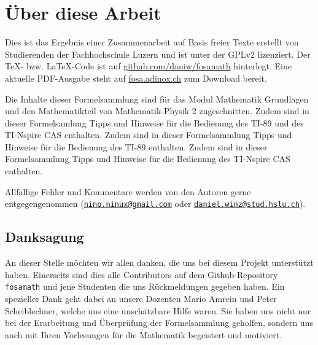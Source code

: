 



\chapter*{Über diese Arbeit}
Dies ist das Ergebnis einer Zusammenarbeit auf Basis freier Texte erstellt von 
Studierenden der Fachhochschule Luzern und ist unter der GPLv2 lizenziert. 
Der \TeX - bzw. \LaTeX -Code ist auf \url{github.com/daniw/fosamath} 
hinterlegt. Eine aktuelle PDF-Ausgabe steht auf \url{fosa.adinox.ch} zum 
Download bereit.

Die Inhalte dieser Formelsammlung sind für das Modul Mathematik Grundlagen 
und den Mathematikteil von Mathematik-Physik 2 zugeschnitten. 
%
\iftiboth
	Zudem sind in dieser Formelsamlung Tipps und Hinweise für die Bedienung 
    des TI-89 und des TI-Nspire CAS enthalten. 
	\else
	\ifti
		Zudem sind in dieser Formelsammlung Tipps und Hinweise für die 
        Bedienung des TI-89 enthalten. 
	\fi
	\ifnspire
		Zudem sind in dieser Formelsammlung Tipps und Hinweise für die 
        Bedienung des TI-Nspire CAS enthalten. 
	\fi
\fi

Allfällige Fehler und Kommentare werden von den Autoren gerne entgegengenommen
(\href{mailto:nino.ninux@gmail.com}{\nolinkurl{nino.ninux@gmail.com}} oder 
\href{mailto:daniel.winz@stud.hslu.ch}{\nolinkurl{daniel.winz@stud.hslu.ch}}).

\section*{Danksagung}
An dieser Stelle möchten wir allen danken, die uns bei diesem Projekt 
unterstützt haben.
Einerseits sind dies alle Contributors auf dem Github-Repository 
\verb!fosamath! und jene Studenten die uns Rückmeldungen gegeben haben.
Ein spezieller Dank geht dabei an unsere Dozenten Mario Amrein und Peter 
Scheiblechner, welche uns eine unschätzbare Hilfe waren.
Sie haben uns nicht nur bei der Erarbeitung und Überprüfung der Formelsammlung 
geholfen, sondern uns auch mit Ihren Vorlesungen für die Mathematik begeistert 
und motiviert.


